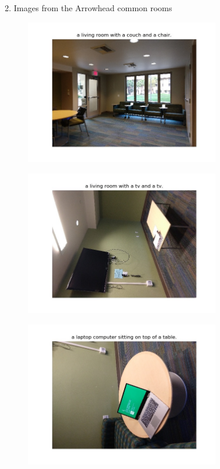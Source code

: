 2. Images from the Arrowhead common rooms
\begin{figure}[h!]
\includegraphics[width=0.75\textwidth]{assets/eg/r5_out.jpg}
\end{figure}
\begin{figure}[h!]
\includegraphics[width=0.75\textwidth]{assets/eg/r6_out.jpg}
\end{figure}
\begin{figure}[h!]
\includegraphics[width=0.75\textwidth]{assets/eg/r7_out.jpg}
\end{figure}

